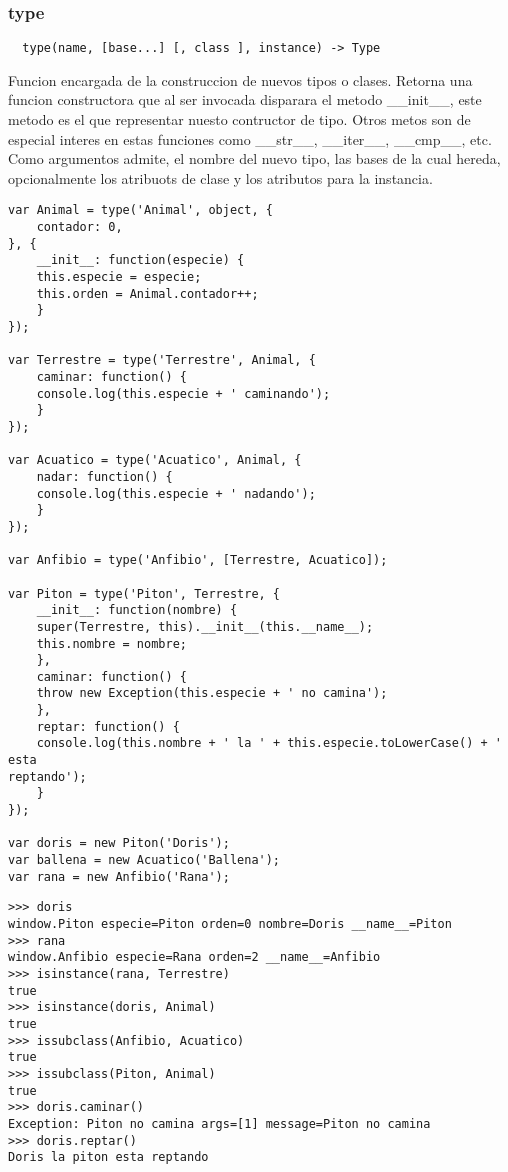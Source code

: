 \subsubsection*{type}
\begin{verbatim}
  type(name, [base...] [, class ], instance) -> Type
\end{verbatim} 
Funcion encargada de la construccion de nuevos tipos o clases.
Retorna una funcion constructora que al ser invocada disparara el metodo
__init__, este metodo es el que representar nuesto contructor de tipo. Otros
metos son de especial interes en estas funciones como __str__, __iter__,
__cmp__, etc.
Como argumentos admite, el nombre del nuevo tipo, las bases de la cual hereda,
opcionalmente los atribuots de clase y los atributos para la instancia.
\begin{lstlisting}[style=javascript,label=definicion-de-tipos,caption=Definicion
de tipos]
var Animal = type('Animal', object, {
    contador: 0,
}, {
    __init__: function(especie) {
	this.especie = especie;
	this.orden = Animal.contador++;
    }
});

var Terrestre = type('Terrestre', Animal, {
    caminar: function() {
	console.log(this.especie + ' caminando');
    }
});

var Acuatico = type('Acuatico', Animal, {
    nadar: function() {
	console.log(this.especie + ' nadando');
    }
});

var Anfibio = type('Anfibio', [Terrestre, Acuatico]);

var Piton = type('Piton', Terrestre, {
    __init__: function(nombre) {
	super(Terrestre, this).__init__(this.__name__);
	this.nombre = nombre;
    },
    caminar: function() {
	throw new Exception(this.especie + ' no camina');
    },
    reptar: function() {
	console.log(this.nombre + ' la ' + this.especie.toLowerCase() + ' esta
reptando');
    }
});

var doris = new Piton('Doris');
var ballena = new Acuatico('Ballena');
var rana = new Anfibio('Rana');
\end{lstlisting}

\begin{lstlisting}[style=consola]
>>> doris
window.Piton especie=Piton orden=0 nombre=Doris __name__=Piton
>>> rana
window.Anfibio especie=Rana orden=2 __name__=Anfibio
>>> isinstance(rana, Terrestre)
true
>>> isinstance(doris, Animal)
true
>>> issubclass(Anfibio, Acuatico)
true
>>> issubclass(Piton, Animal)
true
>>> doris.caminar()
Exception: Piton no camina args=[1] message=Piton no camina
>>> doris.reptar()
Doris la piton esta reptando
\end{lstlisting}

